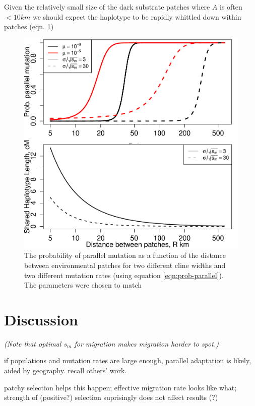 \documentclass{article}
\newcommand{\plr}[1]{{\it\color{blue}(#1)}}
\begin{document}
Given the relatively small size of the dark substrate patches where
$A$ is often $<10km$ we should expect the haplotype to be rapidly
whittled down within patches (eqn. \ref{})

\begin{figure}[ht]
  \begin{center}
    \includegraphics{Lava_flow_mice_prob_parallel}
  \end{center}
  \caption{
The probability of parallel mutation as a function of the distance
between environmental patches for two different cline widths
and two different mutation rates (using equation \eqref{eqn:prob-parallel}). 
The parameters were chosen to match  
  \label{fig:mice_prob_parallel}
  }
\end{figure}


\section{Discussion} 

\plr{Note that optimal $s_m$ for migration makes migration harder to spot.}

if populations and mutation rates are large enough, parallel adaptation is likely, aided by geography. 
recall others' work. 

patchy selection helps this happen; 
effective migration rate looks like what; 
strength of (positive?) selection suprisingly does not affect results (?) 
\end{document}
